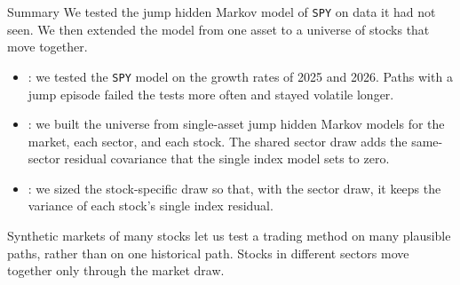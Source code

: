 \documentclass[aspectratio=169,11pt]{beamer}
\begin{document}
\begin{frame}{Summary}
  \vspace{0.3em}
  We tested the jump hidden Markov model of \texttt{SPY} on data it had not seen. We then
  extended the model from one asset to a universe of stocks that move together.

  \vspace{0.4em}
  {\large\textbf{}}
  \begin{itemize}\setlength{\itemsep}{0.4em}
    \item {}: we tested the \texttt{SPY} model on the growth rates of 2025
      and 2026. Paths with a jump episode failed the tests more often and stayed volatile longer.
    \item {}: we built the universe from single-asset jump hidden Markov
      models for the market, each sector, and each stock. The shared sector draw adds the
      same-sector residual covariance that the single index model sets to zero.
    \item {}: we sized the stock-specific draw so that, with the sector
      draw, it keeps the variance of each stock's single index residual.
  \end{itemize}
  \vspace{0.3em}
  Synthetic markets of many stocks let us test a trading method on many plausible paths, rather
  than on one historical path. Stocks in different sectors move together only through the market draw.
\end{frame}
\end{document}
